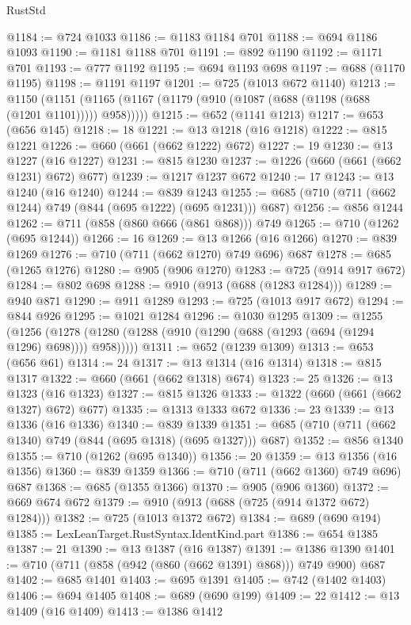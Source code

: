 \begin{lexlean}{RustStd}
\begin{coremodule}
@1184 := @724 @1033
@1186 := @1183 @1184 @701
@1188 := @694 @1186 @1093
@1190 := @1181 @1188 @701
@1191 := @892 @1190
@1192 := @1171 @701
@1193 := @777 @1192
@1195 := @694 @1193 @698
@1197 := @688 (@1170 @1195)
@1198 := @1191 @1197
@1201 := @725 (@1013 @672 @1140)
@1213 := @1150
    (@1151 (@1165 (@1167 (@1179 (@910 (@1087 (@688 (@1198 (@688 (@1201 @1101))))) @958)))))
@1215 := @652 (@1141 @1213)
@1217 := @653 (@656 @145)
@1218 := 18
@1221 := @13 @1218 (@16 @1218)
@1222 := @815 @1221
@1226 := @660 (@661 (@662 @1222) @672)
@1227 := 19
@1230 := @13 @1227 (@16 @1227)
@1231 := @815 @1230
@1237 := @1226 (@660 (@661 (@662 @1231) @672) @677)
@1239 := @1217 @1237 @672
@1240 := 17
@1243 := @13 @1240 (@16 @1240)
@1244 := @839 @1243
@1255 := @685 (@710 (@711 (@662 @1244) @749 (@844 (@695 @1222) (@695 @1231))) @687)
@1256 := @856 @1244
@1262 := @711 (@858 (@860 @666 (@861 @868))) @749
@1265 := @710 (@1262 (@695 @1244))
@1266 := 16
@1269 := @13 @1266 (@16 @1266)
@1270 := @839 @1269
@1276 := @710 (@711 (@662 @1270) @749 @696) @687
@1278 := @685 (@1265 @1276)
@1280 := @905 (@906 @1270)
@1283 := @725 (@914 @917 @672)
@1284 := @802 @698
@1288 := @910 (@913 (@688 (@1283 @1284)))
@1289 := @940 @871
@1290 := @911 @1289
@1293 := @725 (@1013 @917 @672)
@1294 := @844 @926
@1295 := @1021 @1284
@1296 := @1030 @1295
@1309 := @1255
    (@1256 (@1278 (@1280 (@1288 (@910 (@1290 (@688 (@1293 (@694 (@1294 @1296) @698)))) @958)))))
@1311 := @652 (@1239 @1309)
@1313 := @653 (@656 @61)
@1314 := 24
@1317 := @13 @1314 (@16 @1314)
@1318 := @815 @1317
@1322 := @660 (@661 (@662 @1318) @674)
@1323 := 25
@1326 := @13 @1323 (@16 @1323)
@1327 := @815 @1326
@1333 := @1322 (@660 (@661 (@662 @1327) @672) @677)
@1335 := @1313 @1333 @672
@1336 := 23
@1339 := @13 @1336 (@16 @1336)
@1340 := @839 @1339
@1351 := @685 (@710 (@711 (@662 @1340) @749 (@844 (@695 @1318) (@695 @1327))) @687)
@1352 := @856 @1340
@1355 := @710 (@1262 (@695 @1340))
@1356 := 20
@1359 := @13 @1356 (@16 @1356)
@1360 := @839 @1359
@1366 := @710 (@711 (@662 @1360) @749 @696) @687
@1368 := @685 (@1355 @1366)
@1370 := @905 (@906 @1360)
@1372 := @669 @674 @672
@1379 := @910 (@913 (@688 (@725 (@914 @1372 @672) @1284)))
@1382 := @725 (@1013 @1372 @672)
@1384 := @689 (@690 @194)
@1385 := LexLeanTarget.RustSyntax.IdentKind.part
@1386 := @654 @1385
@1387 := 21
@1390 := @13 @1387 (@16 @1387)
@1391 := @1386 @1390
@1401 := @710 (@711 (@858 (@942 (@860 (@662 @1391) @868))) @749 @900) @687
@1402 := @685 @1401
@1403 := @695 @1391
@1405 := @742 (@1402 @1403)
@1406 := @694 @1405
@1408 := @689 (@690 @199)
@1409 := 22
@1412 := @13 @1409 (@16 @1409)
@1413 := @1386 @1412

\end{coremodule}
\end{lexlean}
